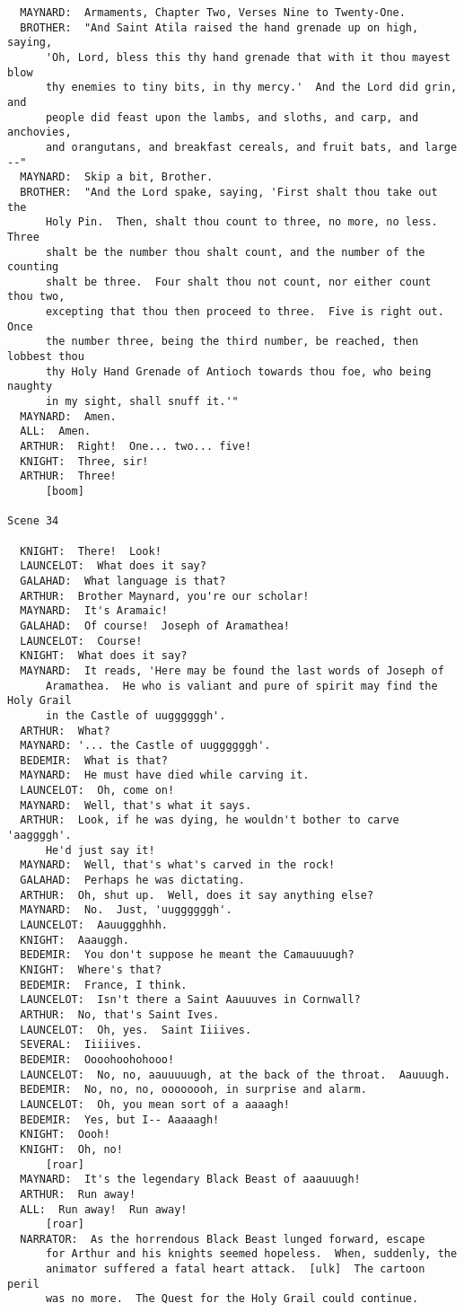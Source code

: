 \documentclass{article}
\begin{document}
\begin{verbatim}
  MAYNARD:  Armaments, Chapter Two, Verses Nine to Twenty-One.
  BROTHER:  "And Saint Atila raised the hand grenade up on high, saying,
      'Oh, Lord, bless this thy hand grenade that with it thou mayest blow
      thy enemies to tiny bits, in thy mercy.'  And the Lord did grin, and
      people did feast upon the lambs, and sloths, and carp, and anchovies,
      and orangutans, and breakfast cereals, and fruit bats, and large --"
  MAYNARD:  Skip a bit, Brother.
  BROTHER:  "And the Lord spake, saying, 'First shalt thou take out the
      Holy Pin.  Then, shalt thou count to three, no more, no less.  Three
      shalt be the number thou shalt count, and the number of the counting
      shalt be three.  Four shalt thou not count, nor either count thou two,
      excepting that thou then proceed to three.  Five is right out.  Once
      the number three, being the third number, be reached, then lobbest thou
      thy Holy Hand Grenade of Antioch towards thou foe, who being naughty
      in my sight, shall snuff it.'"
  MAYNARD:  Amen.
  ALL:  Amen.
  ARTHUR:  Right!  One... two... five!
  KNIGHT:  Three, sir!
  ARTHUR:  Three!
      [boom]

Scene 34

  KNIGHT:  There!  Look!
  LAUNCELOT:  What does it say?
  GALAHAD:  What language is that?
  ARTHUR:  Brother Maynard, you're our scholar!
  MAYNARD:  It's Aramaic!
  GALAHAD:  Of course!  Joseph of Aramathea!
  LAUNCELOT:  Course!
  KNIGHT:  What does it say?
  MAYNARD:  It reads, 'Here may be found the last words of Joseph of
      Aramathea.  He who is valiant and pure of spirit may find the Holy Grail
      in the Castle of uuggggggh'.
  ARTHUR:  What?
  MAYNARD: '... the Castle of uuggggggh'.
  BEDEMIR:  What is that?
  MAYNARD:  He must have died while carving it.
  LAUNCELOT:  Oh, come on!
  MAYNARD:  Well, that's what it says.
  ARTHUR:  Look, if he was dying, he wouldn't bother to carve 'aaggggh'.
      He'd just say it!
  MAYNARD:  Well, that's what's carved in the rock!
  GALAHAD:  Perhaps he was dictating.
  ARTHUR:  Oh, shut up.  Well, does it say anything else?
  MAYNARD:  No.  Just, 'uuggggggh'.
  LAUNCELOT:  Aauuggghhh.
  KNIGHT:  Aaauggh.
  BEDEMIR:  You don't suppose he meant the Camauuuugh?
  KNIGHT:  Where's that?
  BEDEMIR:  France, I think.
  LAUNCELOT:  Isn't there a Saint Aauuuves in Cornwall?
  ARTHUR:  No, that's Saint Ives.
  LAUNCELOT:  Oh, yes.  Saint Iiiives.
  SEVERAL:  Iiiiives.
  BEDEMIR:  Oooohoohohooo!
  LAUNCELOT:  No, no, aauuuuugh, at the back of the throat.  Aauuugh.
  BEDEMIR:  No, no, no, oooooooh, in surprise and alarm.
  LAUNCELOT:  Oh, you mean sort of a aaaagh!
  BEDEMIR:  Yes, but I-- Aaaaagh!
  KNIGHT:  Oooh!
  KNIGHT:  Oh, no!
      [roar]
  MAYNARD:  It's the legendary Black Beast of aaauuugh!
  ARTHUR:  Run away!
  ALL:  Run away!  Run away!
      [roar]
  NARRATOR:  As the horrendous Black Beast lunged forward, escape
      for Arthur and his knights seemed hopeless.  When, suddenly, the
      animator suffered a fatal heart attack.  [ulk]  The cartoon peril
      was no more.  The Quest for the Holy Grail could continue.


\end{verbatim}
\end{document}

